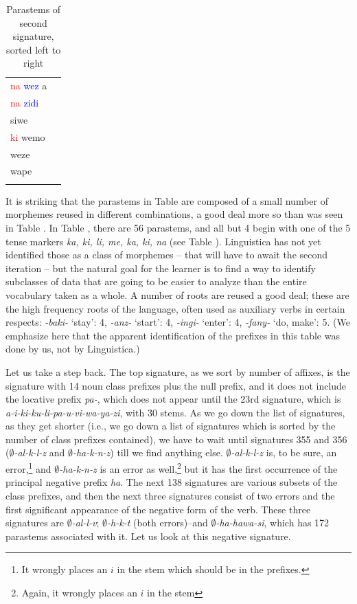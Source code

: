 \documentclass[output=paper,colorlinks,citecolor=brown]{langscibook}
\begin{document}
\begin{table}
\begin{minipage}[t]{.24\textwidth}
\begin{tabular}{ll}
\textcolor{red}{na} \textcolor{blue}{wez} a \\ 
\textcolor{red}{na} \textcolor{blue}{zidi} \\ 
siwe \\ 
\textcolor{red}{ki} wemo \\ 
weze \\ 
wape \\ 
\lspbottomrule
\end{tabular}
\end{minipage}
\caption{Parastems of second signature, sorted left to right}
 \label{2ndsignatureparastemsalphabetized}
\end{table}
 
It is striking that the parastems in Table  are composed of a small number of morphemes reused in different combinations, a good deal more so than was seen in Table . In Table , there are 56 parastems, and all but 4 begin with one of the 5 tense markers \textit{ka, ki, li, me, ka, ki, na} (see Table ). Linguistica has not yet identified those as a class of morphemes -- that will have to await the second iteration -- but the natural goal for the learner is to find a way to identify subclasses of data that are going to be easier to analyze than the entire vocabulary taken as a whole.  A number of roots are reused a good deal; these are the high frequency roots of the language, often used as auxiliary verbs in certain respects: \textit{-baki-} `stay': 4, \textit{-anz-} `start': 4, \textit{-ingi-} `enter': 4, \textit{-fany-} `do, make': 5. (We emphasize here that the apparent identification of the prefixes in this table was done by us, not by Linguistica.) 


Let us take a step back. The top signature, as we sort by number of affixes, is the signature with 14 noun class prefixes plus the null prefix, and it does not include the locative prefix \textit{pa-}, which does not appear until the 23rd signature, which is \textit{a-i-ki-ku-li-pa-u-vi-wa-ya-zi}, with 30 stems.  As we go down the list of signatures, as they get shorter (i.e., we go down a list of signatures which is sorted by the number of class prefixes contained), we have to wait until signatures 355 and 356 (\textit{$\emptyset$-al-k-l-z} and \textit{$\emptyset$-ha-k-n-z}) till we find anything else. \textit{$\emptyset$-al-k-l-z} is, to be sure, an error,\footnote{It wrongly places an $i$ in the stem which should be in the prefixes.} and \textit{$\emptyset$-ha-k-n-z} is an error as well,\footnote{Again, it wrongly places an $i$ in the stem} but it has the first occurrence of the principal negative prefix \textit{ha}. The next 138 signatures are various subsets of the class prefixes, and then the next three signatures consist of two errors and the first significant appearance of the negative form of the verb. These three signatures are \textit{$\emptyset$-al-l-v}; \textit{$\emptyset$-h-k-t} (both errors)--and \textit{$\emptyset$-ha-hawa-si}, which has 172 parastems associated with it. Let us look at this negative signature.
 
\end{document}

